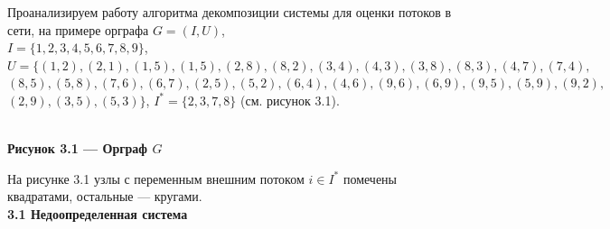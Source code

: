 \documentclass[14pt]{extarticle}%
\begin{document}
Проанализируем работу алгоритма декомпозиции системы для оценки потоков в сети, на примере орграфа $G=(I,U)$,\\ $I=\{1,2,3,4,5,6,7,8,9\}$, \\$U=\{(1,2), (2,1), (1,5),(1,5), (2,8),(8,2), (3,4),(4,3), (3,8), (8,3), (4,7),(7,4),$\\ $(8,5), (5,8), (7,6), (6,7), (2,5),(5,2), (6,4),(4,6), (9,6),(6,9), (9,5),(5,9), (9,2),$\\$(2,9), (3,5),(5,3)\}$, $I^*=\{2,3,7,8\}$ (см. рисунок 3.1).

\begin{center}
\\
\textbf{Рисунок 3.1 --- Орграф $G$}
\end{center}

На рисунке 3.1 узлы с переменным внешним потоком $i\in I^*$ помечены квадратами, остальные --- кругами.\\

\textbf{3.1 Недоопределенная система}
\end{document}
